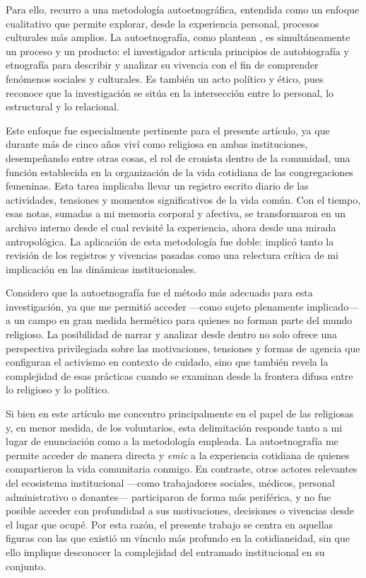 \documentclass[
  spanish,
  11pt,
  a4paper,
]{scrbook}
\begin{document}
Para ello, recurro a una metodología autoetnográfica, entendida como un
enfoque cualitativo que permite explorar, desde la experiencia personal,
procesos culturales más amplios. La autoetnografía, como plantean
\textcite[17-18]{Ellis2010}, es simultáneamente un proceso y un
producto: el investigador articula principios de autobiografía y
etnografía para describir y analizar su vivencia con el fin de
comprender fenómenos sociales y culturales. Es también un acto político
y ético, pues reconoce que la investigación se sitúa en la intersección
entre lo personal, lo estructural y lo relacional.

Este enfoque fue especialmente pertinente para el presente artículo, ya
que durante más de cinco años viví como religiosa en ambas
instituciones, desempeñando entre otras cosas, el rol de cronista dentro
de la comunidad, una función establecida en la organización de la vida
cotidiana de las congregaciones femeninas. Esta tarea implicaba llevar
un registro escrito diario de las actividades, tensiones y momentos
significativos de la vida común. Con el tiempo, esas notas, sumadas a mi
memoria corporal y afectiva, se transformaron en un archivo interno
desde el cual revisité la experiencia, ahora desde una mirada
antropológica. La aplicación de esta metodología fue doble: implicó
tanto la revisión de los registros y vivencias pasadas como una
relectura crítica de mi implicación en las dinámicas institucionales.

Considero que la autoetnografía fue el método más adecuado para esta
investigación, ya que me permitió acceder ---como sujeto plenamente
implicado--- a un campo en gran medida hermético para quienes no forman
parte del mundo religioso. La posibilidad de narrar y analizar desde
dentro no solo ofrece una perspectiva privilegiada sobre las
motivaciones, tensiones y formas de agencia que configuran el activismo
en contexto de cuidado, sino que también revela la complejidad de esas
prácticas cuando se examinan desde la frontera difusa entre lo religioso
y lo político.

Si bien en este artículo me concentro principalmente en el papel de las
religiosas y, en menor medida, de los voluntarios, esta delimitación
responde tanto a mi lugar de enunciación como a la metodología empleada.
La autoetnografía me permite acceder de manera directa y \emph{emic} a
la experiencia cotidiana de quienes compartieron la vida comunitaria
conmigo. En contraste, otros actores relevantes del ecosistema
institucional ---como trabajadores sociales, médicos, personal
administrativo o donantes--- participaron de forma más periférica, y no
fue posible acceder con profundidad a sus motivaciones, decisiones o
vivencias desde el lugar que ocupé. Por esta razón, el presente trabajo
se centra en aquellas figuras con las que existió un vínculo más
profundo en la cotidianeidad, sin que ello implique desconocer la
complejidad del entramado institucional en su conjunto.
\end{document}
